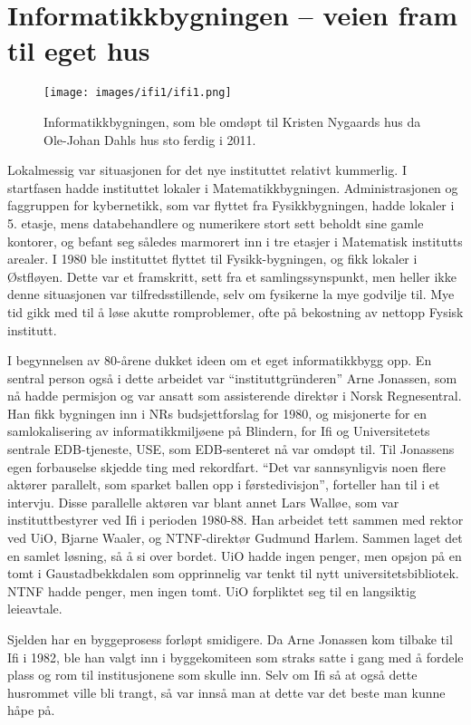 \chapter[Ifi 1]{Informatikkbygningen – veien fram til eget hus}

\begin{figure}
	\texttt{[image: images/ifi1/ifi1.png]}
	\caption{Informatikkbygningen, som ble omdøpt til Kristen Nygaards hus da Ole-Johan Dahls hus sto ferdig i 2011.}
\end{figure}

Lokalmessig var situasjonen for det nye instituttet relativt kummerlig. I startfasen hadde instituttet lokaler i Matematikkbygningen. Administrasjonen og faggruppen for kybernetikk, som var flyttet fra Fysikkbygningen, hadde lokaler i 5. etasje, mens databehandlere og numerikere stort sett beholdt sine gamle kontorer, og befant seg således marmorert inn i tre etasjer i Matematisk institutts arealer. I 1980 ble instituttet flyttet til Fysikk-bygningen, og fikk lokaler i Østfløyen. Dette var et framskritt, sett fra et samlingssynspunkt, men heller ikke denne situasjonen var tilfredsstillende, selv om fysikerne la mye godvilje til. Mye tid gikk med til å løse akutte romproblemer, ofte på bekostning av nettopp Fysisk institutt.

I begynnelsen av 80-årene dukket ideen om et eget informatikkbygg opp. En sentral person også i dette arbeidet var ``instituttgründeren'' Arne Jonassen, som nå hadde permisjon og var ansatt som assisterende direktør i Norsk Regnesentral. Han fikk bygningen inn i NRs budsjettforslag for 1980, og misjonerte for en samlokalisering av informatikkmiljøene på Blindern, for Ifi og Universitetets sentrale EDB-tjeneste, USE, som EDB-senteret nå var omdøpt til. Til Jonassens egen forbauselse skjedde ting med rekordfart. ``Det var sannsynligvis noen flere aktører parallelt, som sparket ballen opp i førstedivisjon'', forteller han til i et intervju. Disse parallelle aktøren var blant annet Lars Walløe, som var instituttbestyrer ved Ifi i perioden 1980-88. Han arbeidet tett sammen med rektor ved UiO, Bjarne Waaler, og NTNF-direktør Gudmund Harlem. Sammen laget det en samlet løsning, så å si over bordet. UiO hadde ingen penger, men opsjon på en tomt i Gaustadbekkdalen som opprinnelig var tenkt til nytt universitetsbibliotek. NTNF hadde penger, men ingen tomt. UiO forpliktet seg til en langsiktig leieavtale.

Sjelden har en byggeprosess forløpt smidigere. Da Arne Jonassen kom tilbake til Ifi i 1982, ble han valgt inn i byggekomiteen som straks satte i gang med å fordele plass og rom til institusjonene som skulle inn. Selv om Ifi så at også dette husrommet ville bli trangt, så var innså man at dette var det beste man kunne håpe på.

